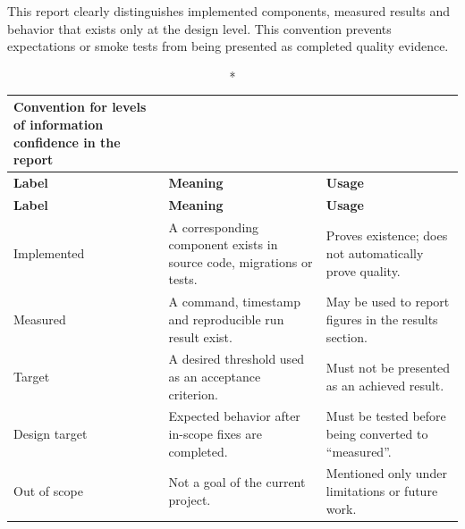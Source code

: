 \setcounter{table}{0}


This report clearly distinguishes implemented components, measured results and
behavior that exists only at the design level. This convention prevents
expectations or smoke tests from being presented as completed quality evidence.

\begin{longtable}{@{}L{3.0cm}L{5.2cm}L{5.8cm}@{}}
  \caption*{Convention for levels of information confidence in the report}\\
  \toprule
  \textbf{Label} & \textbf{Meaning} & \textbf{Usage} \\
  \midrule
  \endfirsthead
  \toprule
  \textbf{Label} & \textbf{Meaning} & \textbf{Usage} \\
  \midrule
  \endhead
  Implemented & A corresponding component exists in source code, migrations or tests. & Proves existence; does not automatically prove quality. \\
  Measured & A command, timestamp and reproducible run result exist. & May be used to report figures in the results section. \\
  Target & A desired threshold used as an acceptance criterion. & Must not be presented as an achieved result. \\
  Design target & Expected behavior after in-scope fixes are completed. & Must be tested before being converted to ``measured''. \\
  Out of scope & Not a goal of the current project. & Mentioned only under limitations or future work. \\
  \bottomrule
\end{longtable}

